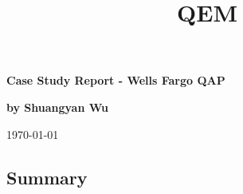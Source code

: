 \documentclass[11pt]{article}
\title{ QEM}
\begin{document}
\begin{titlepage}
   \begin{center}
       \vspace*{6cm}

       \textbf{Case Study Report - Wells Fargo QAP
     }
       \vspace{0.5cm} 
       
       \textbf{by Shuangyan Wu}\\
       
       \vfill
       
      
       \vspace{0.8cm}
       \today
            
   \end{center}
\end{titlepage}
\tableofcontents
\listoffigures
\listoftables
\newpage
\begin{center}
\section*{Summary} 
\end{center}
\end{document}
